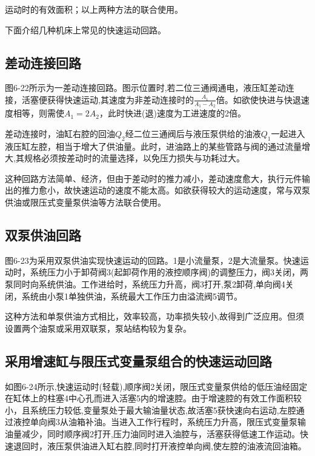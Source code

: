 运动时的有效面积；以上两种方法的联合使用。

下面介绍几种机床上常见的快速运动回路。

\subsection{差动连接回路}

\begin{spacing}{2.0}
图6-22所示为一差动连接回路。图示位置时,若二位三通阀通电，液压缸差动连接，活塞便获得快速运动,其速度为非差动连接时的$ \displaystyle\frac{A_{1}}{A_{1}-A_{2}}$倍。如欲使快进与快退速度相等，则需使$A_{1}=2A_{2}$，此时快进(退)速度为工进速度的2倍。
\end{spacing}

差动连接时，油缸右腔的回油$Q_{2}$经二位三通阀后与液压泵供给的油液$Q_{1}$一起进入液压缸左腔，相当于增大了供油量。此时，进油路上的某些管路与阀的通过流量增大,其规格必须按差动时的流量选择，以免压力损失与功耗过大。

这种回路方法简单、经济，但由于差动时的推力减小，差动速度愈大，执行元件输出的推力愈小，故快速运动的速度不能太高。如欲获得较大的运动速度，常与双泵供油或限压式变量泵供油等方法联合使用。

\subsection{双泵供油回路}

图6-23为采用双泵供油实现快速运动的回路。1是小流量泵，2是大流量泵。快速运动时，系统压力小于卸荷阀3(起卸荷作用的液控顺序阀)的调整压力，阀3关闭，两泵同时向系统供油。工作进给时，系统压力升高，阀3打开,泵2卸荷,单向阀4关闭，系统由小泵1单独供油，系统最大工作压力由溢流阀5调节。

这种方法和单泵供油方式相比，效率较高，功率损失较小,故得到广泛应用。但须设置两个油泵或采用双联泵，泵站结构较为复杂。

\subsection{采用增速缸与限压式变量泵组合的快速运动回路}

如图6-24所示,快速运动时(轻载),顺序阀2关闭，限压式变量泵供给的低压油经固定在缸体上的柱塞4中心孔而进入活塞5内的增速腔\uppercase\expandafter{}。由于增速腔\uppercase\expandafter{}的有效工作面积较小，且系统压力较低,变量泵处于最大输油量状态,故活塞5获快速向右运动,左腔\uppercase\expandafter{}通过液控单向阀3从油箱补油。当进入工作行程时，系统压力升高，限压式变量泵输油量减少，同时顺序阀2打开,压力油同时进入油腔\uppercase\expandafter{}与\uppercase\expandafter{}，活塞获得低速工作运动。快速退回时，液压泵供油进入缸右腔\uppercase\expandafter{},同时打开液控单向阀,使左腔\uppercase\expandafter{}的油液流回油箱。

